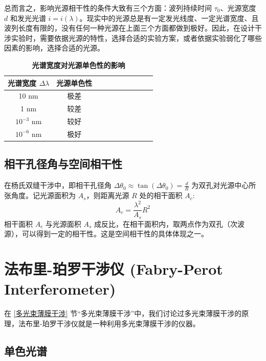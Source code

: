 \documentclass[UTF8]{report}
\theoremstyle{MyLineTheoremStyle} %
\theoremstyle{MyBlockTheoremStyle} %
\theoremstyle{MySubsubsectionStyle} %
\begin{document}
总而言之，影响光源相干性的条件大致有三个方面：波列持续时间 $\tau_0$、光源宽度 $d$ 和发光光谱 $i = i(\lambda)$。现实中的光源总是有一定发光线度、一定光谱宽度、且波列长度有限的，没有任何一种光源在上面三个方面都做到极好。因此，在设计干涉实验时，需要依据光源的特性，选择合适的实验方案，或者依据实验弱化了哪些因素的影响，选择合适的光源。

\begin{table}[H]\centering
    \caption{\textbf{光谱宽度对光源单色性的影响}}
    \label{光谱宽度对光源单色性的影响}
\begin{tabular}{cccccccccc}\toprule
    光谱宽度 $\Delta \lambda$ & 光源单色性  \\
    \midrule
    10 nm & 极差 \\
    1 nm &  较差 \\
    $10^{-3}$ nm & 较好 \\
    $10^{-6}$ nm & 极好 \\
    \bottomrule
\end{tabular}
\end{table}

\subsection{相干孔径角与空间相干性}

在杨氏双缝干涉中，即相干孔径角 $\Delta \theta_0 \approx \tan \left(\Delta \theta_0\right) = \frac{d}{R}$ 为双孔对光源中心所张角度。记光源面积为 $A_s$，则距离光源 $R$ 处的相干面积 $A_c$: 
\begin{equation}
A_c = \frac{\lambda^2}{A_s} R^2
\end{equation}
相干面积 $A_c$ 与光源面积 $A_s$ 成反比，在相干面积内，取两点作为双孔（次波源），可以得到一定的相干性。这是空间相干性的具体体现之一。

\section{法布里-珀罗干涉仪 (Fabry-Perot Interferometer)}

在 \ref{多光束薄膜干涉} 节“多光束薄膜干涉”中，我们讨论过多光束薄膜干涉的原理，法布里-珀罗干涉仪就是一种利用多光束薄膜干涉的仪器。

\subsection{单色光谱}
\end{document}
